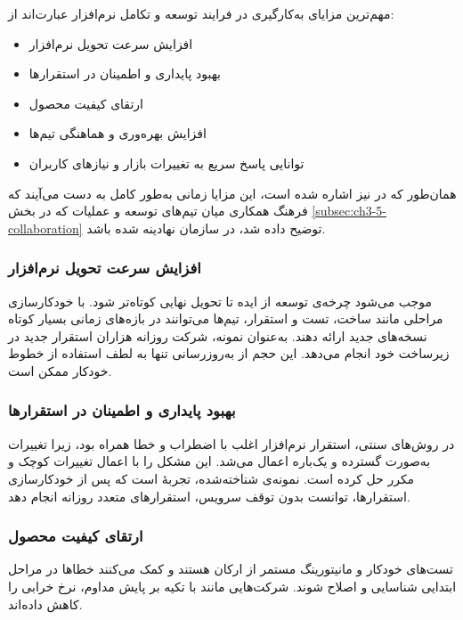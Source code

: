 
مهم‌ترین مزایای به‌کارگیری  در فرایند توسعه و تکامل نرم‌افزار عبارت‌اند از:
\begin{itemize}
    \item افزایش سرعت تحویل نرم‌افزار
    \item بهبود پایداری و اطمینان در استقرارها
    \item ارتقای کیفیت محصول
    \item افزایش بهره‌وری و هماهنگی تیم‌ها
    \item توانایی پاسخ سریع به تغییرات بازار و نیازهای کاربران
\end{itemize}
همان‌طور که در \cite{Jha2023} نیز اشاره شده است، این مزایا زمانی به‌طور کامل به دست می‌آیند که فرهنگ همکاری میان تیم‌های توسعه و عملیات که در بخش \ref{subsec:ch3-5-collaboration} توضیح داده شد، در سازمان نهادینه شده باشد.

\subsubsection*{افزایش سرعت تحویل نرم‌افزار}
 موجب می‌شود چرخه‌ی توسعه از ایده تا تحویل نهایی کوتاه‌تر شود. با خودکارسازی مراحلی مانند ساخت، تست و استقرار، تیم‌ها می‌توانند در بازه‌های زمانی بسیار کوتاه نسخه‌های جدید ارائه دهند. به‌عنوان نمونه، شرکت  روزانه هزاران استقرار جدید در زیرساخت خود انجام می‌دهد. این حجم از به‌روزرسانی تنها به لطف استفاده از خطوط خودکار  ممکن است.

\subsubsection*{بهبود پایداری و اطمینان در استقرارها}
در روش‌های سنتی، استقرار نرم‌افزار اغلب با اضطراب و خطا همراه بود، زیرا تغییرات به‌صورت گسترده و یک‌باره اعمال می‌شد.  این مشکل را با اعمال تغییرات کوچک و مکرر حل کرده است. نمونه‌ی شناخته‌شده، تجربهٔ  است که پس از خودکارسازی استقرارها، توانست بدون توقف سرویس، استقرارهای متعدد روزانه انجام دهد.

\subsubsection*{ارتقای کیفیت محصول}
تست‌های خودکار و مانیتورینگ مستمر از ارکان  هستند و کمک می‌کنند خطاها در مراحل ابتدایی شناسایی و اصلاح شوند. شرکت‌هایی مانند  با تکیه بر پایش مداوم، نرخ خرابی را کاهش داده‌اند.

